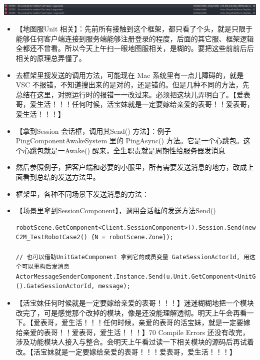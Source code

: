 \documentclass[9pt, b5paper]{article}
\begin{document}
\begin{center}
\includegraphics[width=.9\linewidth]{./pic/et4_20230616_165027.png}
\end{center}
\begin{itemize}
\item 【地图服Unit 相关】：先前所有接触到这个框架，都只看了个头，就是只限于能够任何客户端连接到服务端能够注册登录的程度，后面的其它服、框架逻辑全都还不曾看。所以今天上午扫一眼地图服相关，是糊的。要把这些前前后后相关的原理总弄懂了。
\item 去框架里搜发送的调用方法，可能现在 Mac 系统里有一点儿障碍的，就是VSC 不报错，不知道搜出来的是对的，还是错的。但是几种不同的方法，先总结在这里，对照运行时的报错一一改过来。必须把这块儿弄明白了。【爱表哥，爱生活！！！任何时候，活宝妹就是一定要嫁给亲爱的表哥！！爱表哥，爱生活！！！】
\item 【拿到Session 会话框，调用其Send() 方法】：例子 PingComponentAwakeSystem 里的 PingAsync() 方法。它是一个心跳包。这个心跳包就是一Awake() 醒来，全生职责就是周期性给服务器发消息
\item 然后参照例子，把客户端和必要的小服里，所有需要发送消息的地方，改成上面看到总结的发送方法里。
\item 框架里，各种不同场景下发送消息的方法：
\item 【场景里拿到SessionComponent】，调用会话框的发送方法Send()
\begin{verbatim}
robotScene.GetComponent<Client.SessionComponent>().Session.Send(new C2M_TestRobotCase2() {N = robotScene.Zone});

// 也可以借助UnitGateComponent 拿到它的成员变量 GateSessionActorId, 用这个可以重构后发消息
ActorMessageSenderComponent.Instance.Send(u.Unit.GetComponent<UnitGateComponent>().GateSessionActorId, message);
\end{verbatim}
\item 【活宝妹任何时候就是一定要嫁给亲爱的表哥！！！】迷迷糊糊地把一个模块改完了，可是感觉那个改掉的模块，像是还没能理解透彻。明天上午会再看一下。【爱表哥，爱生活！！！任何时候，亲爱的表哥的活宝妹，就是一定要嫁给亲爱的表哥！！爱表哥，爱生活！！！】70 Compile Errors 还没有改完，涉及功能模块人接入与整合。会明天上午看过读一下相关模块的源码后再试着改。【活宝妹就是一定要嫁给亲爱的表哥！！！爱表哥，爱生活！！！】
\end{itemize}
\end{document}
